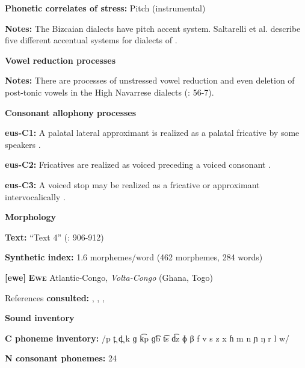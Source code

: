 \textbf{Phonetic correlates of stress:} Pitch (instrumental)



\textbf{Notes:} The Bizcaian dialects have pitch accent system. Saltarelli et al. describe five different accentual systems for dialects of \citet[282-3]{Basque1988}.



\textbf{Vowel reduction processes}



\textbf{Notes:} There are processes of unstressed vowel reduction and even deletion of post-tonic vowels in the High Navarrese dialects (\citealt{HualdeUrbina2003}: 56-7).



\textbf{Consonant allophony processes}



\textbf{eus-C1:} A palatal lateral approximant is realized as a palatal fricative by some speakers \citep[29]{Hualde2003}.



\textbf{eus-C2:} Fricatives are realized as voiced preceding a voiced consonant \citep[24]{Hualde2003}.



\textbf{eus-C3:} A voiced stop may be realized as a fricative or approximant intervocalically \citep[19]{Hualde2003}.



\textbf{Morphology}



\textbf{Text:} “Text 4” (\citealt{HualdeUrbina2003}: 906-912)



\textbf{Synthetic index:} 1.6 morphemes/word (462 morphemes, 284 words)



\textbf{[ewe]}   \textbf{\textsc{Ewe}}  Atlantic-Congo, \textit{Volta-Congo} (Ghana, Togo)



References \textbf{consulted:} \citet{Ameka1991}, \citet{Duthie1996}, \citet{Jalloh2005}, \citet{Stahlke1971}



\textbf{Sound inventory}



\textbf{C phoneme inventory:} /p t̪ d̪ k ɡ k͡p ɡ͡b t͡s d͡z ɸ β f v s z x ɦ m n ɲ ŋ r l w/



\textbf{N consonant phonemes:} 24



